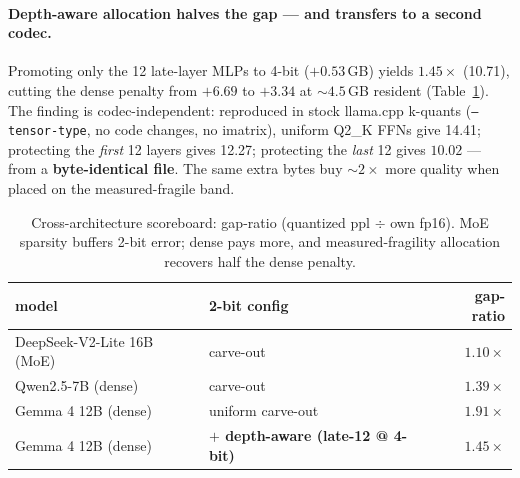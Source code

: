 \documentclass[10pt]{article}
\begin{document}
\paragraph{Depth-aware allocation halves the gap --- and transfers to a second codec.}
Promoting only the 12 late-layer MLPs to 4-bit ($+0.53$\,GB) yields $\mathbf{1.45\times}$ (10.71),
cutting the dense penalty from $+6.69$ to $+3.34$ at ${\sim}4.5$\,GB resident (Table~\ref{tab:dense}).
The finding is codec-independent: reproduced in stock llama.cpp k-quants (\texttt{--tensor-type}, no code
changes, no imatrix), uniform Q2\_K FFNs give 14.41; protecting the \emph{first} 12 layers gives 12.27;
protecting the \emph{last} 12 gives $\mathbf{10.02}$ --- from a \textbf{byte-identical file}. The same
extra bytes buy ${\sim}2\times$ more quality when placed on the measured-fragile band.
\begin{table}[h]\centering\small
\begin{tabular}{llr}
\toprule
model & 2-bit config & gap-ratio \\
\midrule
DeepSeek-V2-Lite 16B (MoE) & carve-out & $\mathbf{1.10\times}$ \\
Qwen2.5-7B (dense) & carve-out & $1.39\times$ \\
Gemma 4 12B (dense) & uniform carve-out & $1.91\times$ \\
Gemma 4 12B (dense) & \textbf{$+$ depth-aware (late-12 @ 4-bit)} & $\mathbf{1.45\times}$ \\
\bottomrule
\end{tabular}
\caption{Cross-architecture scoreboard: gap-ratio (quantized ppl $\div$ own fp16). MoE sparsity buffers
2-bit error; dense pays more, and measured-fragility allocation recovers half the dense penalty.}\label{tab:dense}
\end{table}
\end{document}
